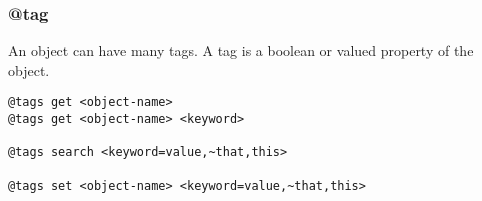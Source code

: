 \subsubsection{@tag}
\label{tag}

An object can have many tags. A tag is a boolean or valued property of the object.

\begin{verbatim}
@tags get <object-name>
@tags get <object-name> <keyword>

@tags search <keyword=value,~that,this>

@tags set <object-name> <keyword=value,~that,this>
\end{verbatim}